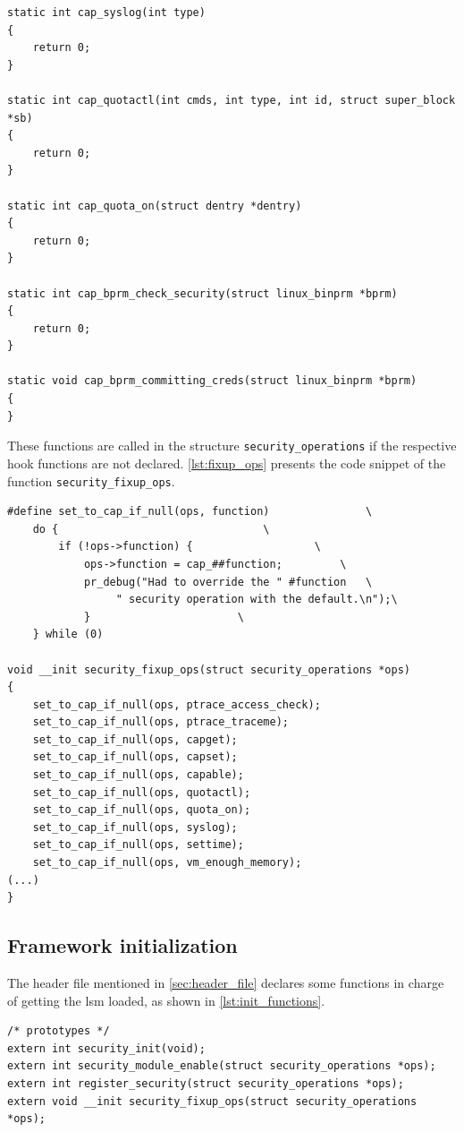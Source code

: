 \begin{lstlisting}[frame=none, numbers=none, caption=Capability functions (Linux kernel v3.11), label=lst:cap_hooks]
static int cap_syslog(int type)
{
	return 0;
}

static int cap_quotactl(int cmds, int type, int id, struct super_block *sb)
{
	return 0;
}

static int cap_quota_on(struct dentry *dentry)
{
	return 0;
}

static int cap_bprm_check_security(struct linux_binprm *bprm)
{
	return 0;
}

static void cap_bprm_committing_creds(struct linux_binprm *bprm)
{
}
\end{lstlisting}

\noindent
These functions are called in the structure \texttt{security\_operations} if the respective hook functions are not declared. \autoref{lst:fixup_ops} presents the code snippet of the function \texttt{security\_fixup\_ops}.

\begin{lstlisting}[frame=none, numbers=none, caption=\texttt{security\_fixup\_ops} function (Linux kernel v3.11), label=lst:fixup_ops]
#define set_to_cap_if_null(ops, function)				\
	do {								\
		if (!ops->function) {					\
			ops->function = cap_##function;			\
			pr_debug("Had to override the " #function	\
				 " security operation with the default.\n");\
			}						\
	} while (0)

void __init security_fixup_ops(struct security_operations *ops)
{
	set_to_cap_if_null(ops, ptrace_access_check);
	set_to_cap_if_null(ops, ptrace_traceme);
	set_to_cap_if_null(ops, capget);
	set_to_cap_if_null(ops, capset);
	set_to_cap_if_null(ops, capable);
	set_to_cap_if_null(ops, quotactl);
	set_to_cap_if_null(ops, quota_on);
	set_to_cap_if_null(ops, syslog);
	set_to_cap_if_null(ops, settime);
	set_to_cap_if_null(ops, vm_enough_memory);
(...)
}
\end{lstlisting}

\subsection{Framework initialization}
\label{sec:framework_initialization}

The header file mentioned in \autoref{sec:header_file} declares some functions in charge of getting the \gls{lsm} loaded, as shown in \autoref{lst:init_functions}.

\begin{lstlisting}[frame=none, numbers=none, caption=Framework initialization functions (Linux kernel v3.11), label=lst:init_functions]
/* prototypes */
extern int security_init(void);
extern int security_module_enable(struct security_operations *ops);
extern int register_security(struct security_operations *ops);
extern void __init security_fixup_ops(struct security_operations *ops);
\end{lstlisting}

